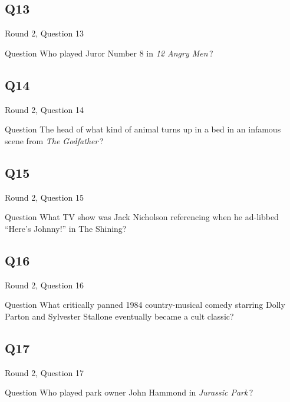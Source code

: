 \documentclass[11pt]{beamer}
\begin{document}
\subsection*{Q13}
\begin{frame}[t]{Round 2, Question 13}
  \vspace{2em}
  \begin{block}{Question}
    Who played Juror Number 8 in \emph{12 Angry Men}\,?
  \end{block}
\end{frame}


\subsection*{Q14}
\begin{frame}[t]{Round 2, Question 14}
  \vspace{2em}
  \begin{block}{Question}
    The head of what kind of animal turns up in a bed in an infamous scene from \emph{The Godfather}\,?
  \end{block}
\end{frame}


\subsection*{Q15}
\begin{frame}[t]{Round 2, Question 15}
  \vspace{2em}
  \begin{block}{Question}
    What TV show was Jack Nicholson referencing when he ad-libbed ``Here's Johnny!'' in The Shining?
  \end{block}
\end{frame}


\subsection*{Q16}
\begin{frame}[t]{Round 2, Question 16}
  \vspace{2em}
  \begin{block}{Question}
    What critically panned 1984 country-musical comedy starring Dolly Parton and Sylvester Stallone eventually became a cult classic?
  \end{block}
\end{frame}


\subsection*{Q17}
\begin{frame}[t]{Round 2, Question 17}
  \vspace{2em}
  \begin{block}{Question}
    Who played park owner John Hammond in \emph{Jurassic Park}\,?
  \end{block}
\end{frame}
\end{document}
